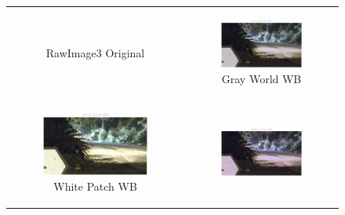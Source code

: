 \documentclass[11pt, a4]{article}
\begin{document}
\begin{enumerate}
\begin{figure}[H]
{\begin{tabular}{cc}
\begin{subfigure}[h]{0.45\linewidth}
							\caption{RawImage3 Original}
							\label{fig:RawImage3_WB_1}
						\end{subfigure} &
						\begin{subfigure}[h]{0.45\linewidth}
							\centering
							\includegraphics[width=\linewidth]{../output/RawImage3_WB_2.pdf}
							\caption{Gray World WB}
							\label{fig:RawImage3_WB_2}
						\end{subfigure}\\
						\begin{subfigure}[h]{0.45\linewidth}
							\centering
							\includegraphics[width=\linewidth]{../output/RawImage3_WB_3.pdf}
							\caption{White Patch WB}
							\label{fig:RawImage3_WB_3}
						\end{subfigure} &
						\begin{subfigure}[h]{0.45\linewidth}
							\centering
							\includegraphics[width=\linewidth]{../output/RawImage3_WB_4.pdf}

\end{subfigure}
\end{tabular}}
\end{figure}
\end{enumerate}
\end{document}
